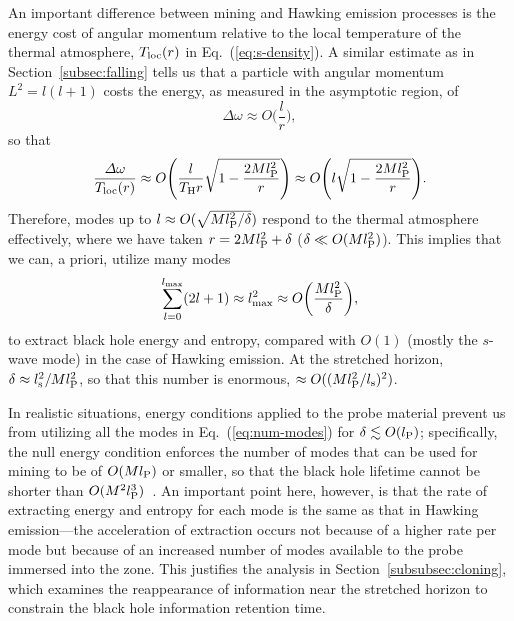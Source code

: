 \documentclass[12pt]{article}
\begin{document}
An important difference between mining and Hawking emission 
processes is the energy cost of angular momentum relative to the 
local temperature of the thermal atmosphere, $T_{\rm loc}(r)$ 
in Eq.~(\ref{eq:s-density}).  A similar estimate as in 
Section~\ref{subsec:falling} tells us that a particle with 
angular momentum $L^2 = l(l+1)$ costs the energy, as measured 
in the asymptotic region, of
%
\begin{equation}
  \varDelta \omega \approx O\biggl(\frac{l}{r}\biggr),
\label{eq:ang-cost}
\end{equation}
%
so that
%
\begin{equation}
  \frac{\varDelta \omega}{T_{\rm loc}(r)} 
  \approx O\Biggl(\frac{l}{T_{\rm H} r} 
    \sqrt{1-\frac{2Ml_{\rm P}^2}{r}}\Biggr) 
  \approx O\Biggl(l \sqrt{1-\frac{2Ml_{\rm P}^2}{r}}\Biggr).
\label{eq:ang-TH}
\end{equation}
%
Therefore, modes up to $l \approx O(\sqrt{Ml_{\rm P}^2/\delta})$ 
respond to the thermal atmosphere effectively, where we have taken 
$r = 2Ml_{\rm P}^2 + \delta$ ($\delta \ll O(Ml_{\rm P}^2)$).  This 
implies that we can, a priori, utilize many modes
%
\begin{equation}
  \sum_{l=0}^{l_{\rm max}}(2l+1) \approx l_{\rm max}^2 
  \approx O\biggl( \frac{Ml_{\rm P}^2}{\delta} \biggr),
\label{eq:num-modes}
\end{equation}
%
to extract black hole energy and entropy, compared with $O(1)$ 
(mostly the $s$-wave mode) in the case of Hawking emission.  At the 
stretched horizon, $\delta \approx l_{\rm s}^2/Ml_{\rm P}^2$, so that 
this number is enormous, $\approx O((Ml_{\rm P}^2/l_{\rm s})^2)$.

In realistic situations, energy conditions applied to the 
probe material prevent us from utilizing all the modes in 
Eq.~(\ref{eq:num-modes}) for $\delta \lesssim O(l_{\rm P})$; 
specifically, the null energy condition enforces the number of 
modes that can be used for mining to be of $O(M l_{\rm P})$ or 
smaller, so that the black hole lifetime cannot be shorter than 
$O(M^2 l_{\rm P}^3)$~\cite{Brown:2012un}.  An important point here, 
however, is that the rate of extracting energy and entropy for 
each mode is the same as that in Hawking emission---the acceleration 
of extraction occurs not because of a higher rate per mode but 
because of an increased number of modes available to the probe 
immersed into the zone.  This justifies the analysis in 
Section~\ref{subsubsec:cloning}, which examines the reappearance 
of information near the stretched horizon to constrain the 
black hole information retention time.
\end{document}
